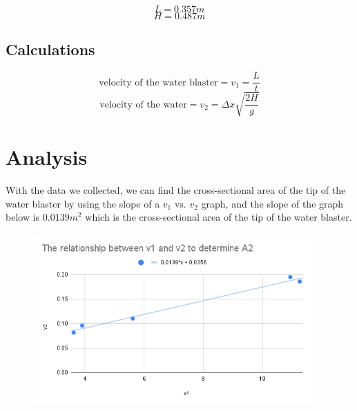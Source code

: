 \documentclass{report}
\begin{document}
$$ L = 0.357 m $$   
$$ H = 0.487 m $$

\subsection*{Calculations}
$$ \text{velocity of the water blaster} = v_1 = \frac{L}{t} $$ 
$$ \text{velocity of the water} = v_2 = \Delta x \sqrt{\frac{2H}{g}} $$

\section*{Analysis} 



With the data we collected, we can find the cross-sectional area of the tip of the water blaster by using the slope of a $v_1 \text{ vs. } v_2 $ graph, and the slope of the graph below is $ 0.0139 m^2 $ which is the cross-sectional area of the tip of the water blaster.


\begin{figure}[ht!]
  \begin{center}
    \includegraphics[width=0.95\textwidth]{figures/graph.png}
  \end{center}
\end{figure}
\end{document}
